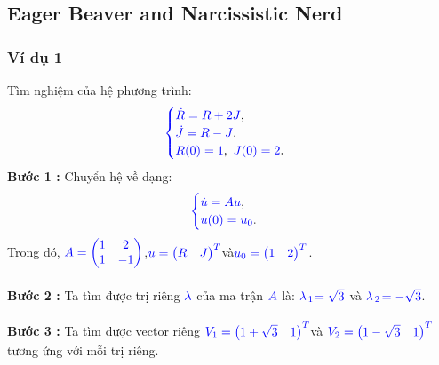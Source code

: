 \documentclass[a4paper]{article}
\begin{document}
\subsection{Eager Beaver and Narcissistic Nerd}
\subsubsection{Ví dụ 1}
Tìm nghiệm của hệ phương trình:
\begin{align}
	    \textcolor{blue}{
	    \begin{cases}
            \dot R = R + 2J \textcolor{black}{,}\\
            \dot J = R - J \textcolor{black}{,}\\
            R(0) = 1\textcolor{black}{,} \enskip J(0) = 2 \textcolor{black}{.}
        \end{cases}
        }
        \notag
	\end{align}
{\bfseries Bước 1 :} Chuyển hệ về dạng:
\begin{align}
	    \textcolor{blue}{
	    \begin{cases}
            \dot u = Au \textcolor{black}{,}\\
            u(0) = u\sb{0}\textcolor{black}{.}
        \end{cases}
        }
        \notag
	\end{align}
Trong đó,  $\textcolor{blue}{A = \begin{pmatrix} 1 & 2\\ 1 & -1 \end{pmatrix}}$,\enskip $\textcolor{blue}{u = \begin{pmatrix} R & J \end{pmatrix}\sp{T}}$\enskip và\enskip $\textcolor{blue}{u\sb{0} = \begin{pmatrix} 1 & 2 \end{pmatrix}\sp{T}}$.\\\\
{\bfseries Bước 2 :} Ta tìm được trị riêng $\textcolor{blue}{\lambda}$ của ma trận $\textcolor{blue}{A}$ là: $\textcolor{blue}{\lambda}$$\textcolor{blue}{\sb{1}}$$\textcolor{blue}{=\sqrt{3}}$ và $\textcolor{blue}{\lambda}$$\textcolor{blue}{\sb{2}}$$\textcolor{blue}{=-\sqrt{3}}$.\\\\
{\bfseries Bước 3 :} Ta tìm được vector riêng \enskip $\textcolor{blue}{V\sb{1} = \begin{pmatrix} 1+\sqrt{3} & 1 \end{pmatrix}\sp{T}}$\enskip và \enskip $\textcolor{blue}{V\sb{2} = \begin{pmatrix} 1-\sqrt{3} & 1 \end{pmatrix}\sp{T}}$\enskip tương ứng với mỗi trị riêng.\\\\
\end{document}
